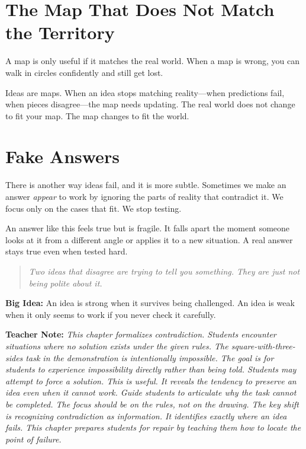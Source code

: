 \documentclass[12pt]{book}
\newenvironment{teachernote}
{\par\medskip\noindent\textbf{Teacher Note:} \itshape}
{\par\medskip}
\begin{document}
\section{The Map That Does Not Match the Territory}

A map is only useful if it matches the real world. When a map is wrong,
you can walk in circles confidently and still get lost.

Ideas are maps. When an idea stops matching reality---when predictions fail,
when pieces disagree---the map needs updating. The real world does not change
to fit your map. The map changes to fit the world.

\section{Fake Answers}

There is another way ideas fail, and it is more subtle. Sometimes we make
an answer \emph{appear} to work by ignoring the parts of reality that
contradict it. We focus only on the cases that fit. We stop testing.

An answer like this feels true but is fragile. It falls apart the moment
someone looks at it from a different angle or applies it to a new situation.
A real answer stays true even when tested hard.

\begin{quote}\itshape
Two ideas that disagree are trying to tell you something.
They are just not being polite about it.
\end{quote}

\textbf{Big Idea:} An idea is strong when it survives being challenged.
An idea is weak when it only seems to work if you never check it carefully.

\begin{teachernote}
This chapter formalizes contradiction. Students encounter situations where
no solution exists under the given rules. The square-with-three-sides task
in the demonstration is intentionally impossible. The goal is for students
to experience impossibility directly rather than being told. Students may
attempt to force a solution. This is useful. It reveals the tendency to
preserve an idea even when it cannot work. Guide students to articulate
why the task cannot be completed. The focus should be on the rules, not
on the drawing. The key shift is recognizing contradiction as information.
It identifies exactly where an idea fails. This chapter prepares students
for repair by teaching them how to locate the point of failure.
\end{teachernote}
\end{document}
